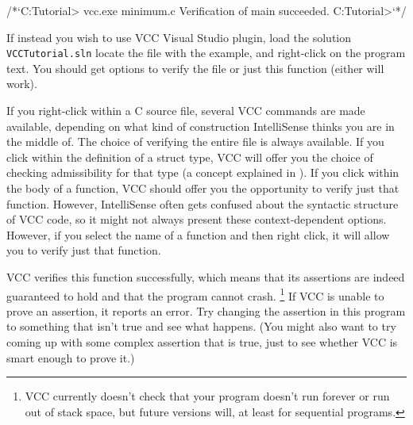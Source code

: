\begin{VCC}
/*`C:\Somewhere\VCC Tutorial> vcc.exe minimum.c
Verification of main succeeded.
C:\Somewhere\VCC Tutorial>`*/
\end{VCC}


If instead you wish to use VCC Visual Studio plugin, load the solution \lstinline|VCCTutorial.sln|
locate the file with the example, and right-click on the program text.
You should get options to verify the file or just this function (either will work).

If you right-click within a C source file,
several VCC commands are made available, depending on what kind of
construction IntelliSense thinks you are in the middle of. The choice
of verifying the entire file is always available. If you click within
the definition of a struct type, VCC will offer you the choice of
checking admissibility for that type (a concept explained in ).
If you click within the body of a function, VCC should offer
you the opportunity to verify just that function. However,
IntelliSense often gets confused about the syntactic structure of
VCC code, so it might not always present these context-dependent
options. However, if you select the name of a function and then right
click, it will allow you to verify just that function.

VCC verifies this function successfully, which means that its
assertions are indeed guaranteed to hold and that the program cannot
crash.%
\footnote{
  VCC currently doesn't check that your program doesn't run forever or
  run out of stack space, but future versions will, at least for sequential
  programs.  
}
If VCC is unable
to prove an assertion, it reports an error.  Try changing the
assertion in this program to something that isn't true and see what
happens. (You might also want to try coming up with some complex
assertion that is true, just to see whether VCC is smart enough to
prove it.)

